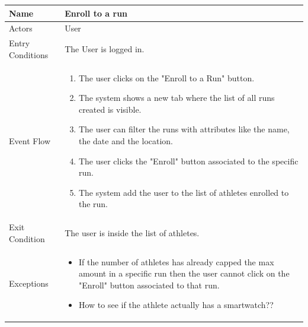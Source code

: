 \begin{enumerate}
\FloatBarrier
\begin{table}[h]
\begin{tabular}{|l|l|}
\hline
Name             & Enroll to a run \\ \hline
Actors           & User  \\ \hline
Entry Conditions & The User is logged in.    \\ \hline
Event Flow       & \parbox{.45\textwidth}{\begin{enumerate}
            \item The user clicks on the "Enroll to a Run" button.
            \item The system shows a new tab where the list of all runs created is visible.
            \item The user can filter the runs with attributes like the name, the date and the location.
            \item The user clicks the "Enroll" button associated to the specific run.
            \item The system add the user to the list of athletes enrolled to the run.
        \end{enumerate}}\\ \hline
Exit Condition   & The user is inside the list of athletes.\\ \hline
Exceptions       & \parbox{.45\textwidth}  
{\begin{itemize}
\item If the number of athletes has already capped the max amount in a specific run then the user cannot click on the "Enroll" button associated to that run.
\item How to see if the athlete actually has a smartwatch??
\end{itemize}}\\ \hline
\end{tabular}
\end{table}
\FloatBarrier


\end{enumerate}
